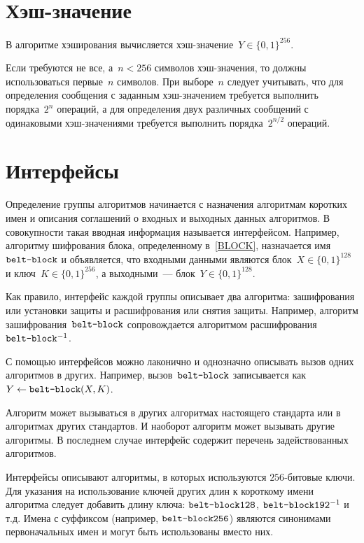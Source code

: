 \section{Хэш-значение}

В алгоритме хэширования вычисляется хэш-значение~$Y\in\{0,1\}^{256}$.

Если требуются не все, а~$n<256$ символов хэш-значения, 
то должны использоваться первые~$n$ символов.
%
При выборе~$n$ следует учитывать, 
что для определения сообщения с заданным хэш-значением
требуется выполнить порядка~$2^n$ операций,
а для определения двух различных сообщений
с одинаковыми хэш-значениями требуется выполнить
порядка~$2^{n/2}$ операций.

\section{Интерфейсы}\label{COMMON.IFace}

Определение группы алгоритмов начинается с назначения алгоритмам коротких 
имен и описания соглашений о входных и выходных данных алгоритмов.
В совокупности такая вводная информация называется интерфейсом.
%
Например, алгоритму шифрования блока, определенному в~\ref{BLOCK},
назначается имя~$\texttt{belt-block}$ и объявляется, что входными 
данными являются блок~$X\in\{0,1\}^{128}$ и ключ~$K\in\{0,1\}^{256}$,
а выходными~--- блок~$Y\in\{0,1\}^{128}$.

Как правило, интерфейс каждой группы описывает два алгоритма: зашифрования 
или установки защиты и расшифрования или снятия защиты. Например, 
алгоритм зашифрования~$\texttt{belt-block}$ сопровождается 
алгоритмом расшифрования~$\texttt{belt-block}^{-1}$.

С помощью интерфейсов можно лаконично и однозначно 
описывать вызов одних алгоритмов в других.
%        	
Например, вызов~$\texttt{belt-block}$ 
записывается как~$Y\leftarrow\texttt{belt-block}(X,K)$.

Алгоритм может вызываться в других алгоритмах настоящего стандарта или 
в алгоритмах других стандартов. И наоборот алгоритм может вызывать другие 
алгоритмы. В последнем случае интерфейс содержит перечень задействованных 
алгоритмов.

Интерфейсы описывают алгоритмы, в которых используются $256$-битовые 
ключи. Для указания на использование ключей других длин к короткому 
имени алгоритма следует добавить длину ключа:
$\texttt{belt-block128}$, $\texttt{belt-block192}^{-1}$ и т.д.
%
Имена с суффиксом  (например, $\texttt{belt-block256}$) 
являются синонимами первоначальных имен и могут быть использованы вместо них.

